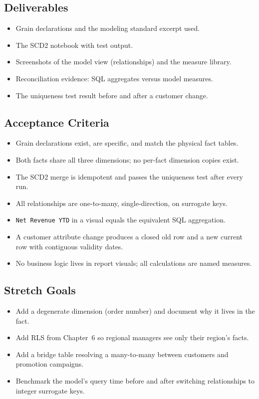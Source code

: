 \subsection*{Deliverables}
\begin{itemize}
    \item Grain declarations and the modeling standard excerpt used.
    \item The SCD2 notebook with test output.
    \item Screenshots of the model view (relationships) and the measure library.
    \item Reconciliation evidence: SQL aggregates versus model measures.
    \item The uniqueness test result before and after a customer change.
\end{itemize}

\subsection*{Acceptance Criteria}
\begin{itemize}
    \item[\(\square\)] Grain declarations exist, are specific, and match the physical fact tables.
    \item[\(\square\)] Both facts share all three dimensions; no per-fact dimension copies exist.
    \item[\(\square\)] The SCD2 merge is idempotent and passes the uniqueness test after every run.
    \item[\(\square\)] All relationships are one-to-many, single-direction, on surrogate keys.
    \item[\(\square\)] \texttt{Net Revenue YTD} in a visual equals the equivalent SQL aggregation.
    \item[\(\square\)] A customer attribute change produces a closed old row and a new current row with contiguous validity dates.
    \item[\(\square\)] No business logic lives in report visuals; all calculations are named measures.
\end{itemize}

\subsection*{Stretch Goals}
\begin{itemize}
    \item Add a degenerate dimension (order number) and document why it lives in the fact.
    \item Add RLS from Chapter~6 so regional managers see only their region's facts.
    \item Add a bridge table resolving a many-to-many between customers and promotion campaigns.
    \item Benchmark the model's query time before and after switching relationships to integer surrogate keys.
\end{itemize}
